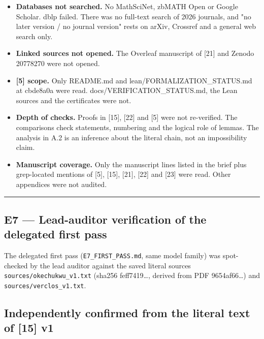 \documentclass[
]{article}
\providecommand{\tightlist}{%
  \setlength{\itemsep}{0pt}\setlength{\parskip}{0pt}}
\begin{document}
\begin{itemize}
\tightlist
\item
  \textbf{Databases not searched.} No MathSciNet, zbMATH Open or Google
  Scholar. dblp failed. There was no full-text search of 2026 journals,
  and "no later version / no journal version" rests on arXiv, Crossref
  and a general web search only.
\item
  \textbf{Linked sources not opened.} The Overleaf manuscript of
  {[}21{]} and Zenodo 20778270 were not opened.
\item
  \textbf{{[}5{]} scope.} Only README.md and
  lean/FORMALIZATION\_STATUS.md at cbde8a0a were read.
  docs/VERIFICATION\_STATUS.md, the Lean sources and the certificates
  were not.
\item
  \textbf{Depth of checks.} Proofs in {[}15{]}, {[}22{]} and {[}5{]}
  were not re-verified. The comparisons check statements, numbering and
  the logical role of lemmas. The analysis in A.2 is an inference about
  the literal chain, not an impossibility claim.
\item
  \textbf{Manuscript coverage.} Only the manuscript lines listed in the
  brief plus grep-located mentions of {[}5{]}, {[}15{]}, {[}21{]},
  {[}22{]} and {[}23{]} were read. Other appendices were not audited.
\end{itemize}

\begin{center}\rule{0.5\linewidth}{0.5pt}\end{center}

\subsection{E7 --- Lead-auditor verification of the delegated first
pass}\label{e7--lead-auditor-verification-of-the-delegated-first-pass}

The delegated first pass (\texttt{E7\_FIRST\_PASS.md}, same model
family) was spot-checked by the lead auditor against the saved literal
sources \texttt{sources/okechukwu\_v1.txt} (sha256 feff7419\ldots,
derived from PDF 9654af66\ldots) and \texttt{sources/verclos\_v1.txt}.

\subsection{Independently confirmed from the literal text of {[}15{]}
v1}\label{independently-confirmed-from-the-literal-text-of-15-v1}
\end{document}
